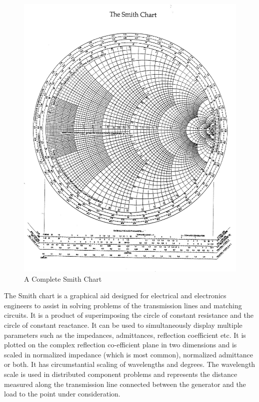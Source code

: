 \begin{figure}[h]
\centering
\includegraphics[width=0.7\linewidth]{"./graphics/smith_chart (2)"}
\caption{A Complete Smith Chart}
\label{fig:smithchart-2}
\end{figure}

The Smith chart is a graphical aid designed for electrical and electronics engineers to assist in solving problems of the transmission lines and matching circuits. It is a product of superimposing the circle of constant resistance and the circle of constant reactance. It can be used to simultaneously display multiple parameters such as the impedances, admittances, reflection coefficient etc.
It is plotted on the complex reflection co-efficient plane in two dimensions and is scaled in normalized impedance (which is most common), normalized admittance or both. It has circumstantial scaling of wavelengths and degrees. The wavelength scale is used in distributed component problems and represents the distance measured along the transmission line connected between the generator and the load to the point under consideration.


